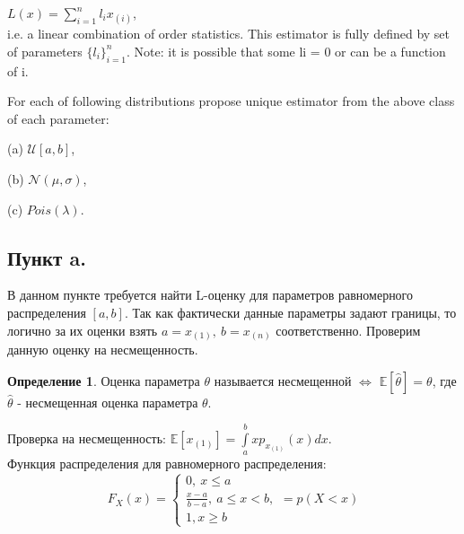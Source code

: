 \documentclass[a4paper]{article}
\theoremstyle{definition}
\newtheorem{definition}{Определение}[section]
\begin{document}
$L(x) = \sum\limits_{i=1}^{n} l_i x_{(i)}$, \\

i.e. a linear combination of order statistics. This estimator is fully defined by set of parameters $\{l_i\}_{i=1}^n$. 
Note: it is possible that some li = 0 or can be a function of i. 

For each of following distributions propose unique estimator from the above class of each parameter:

(a) $\mathcal{U}[a, b]$,

(b) $\mathcal{N}(\mu, \sigma)$,

(c) $Pois(\lambda)$.

\subsection{Пункт a.}
    В данном пункте требуется найти L-оценку для параметров равномерного распределения $[a, b]$. 
    Так как фактически данные параметры задают границы, то логично за их оценки взять $a = x_{(1)},\ b = x_{(n)}$ соответственно.
    Проверим данную оценку на несмещенность.

    \begin{definition} 
        Оценка параметра $\theta$ называется несмещенной $\Leftrightarrow$ $\mathbb{E}[\hat{\theta}] = \theta$, где $\hat{\theta}$ - несмещенная оценка параметра $\theta$.
    \end{definition}

    Проверка на несмещенность: $\mathbb{E}[x_{(1)}] = \int\limits_{a}^{b}xp_{x_{(1)}}(x)dx$. \\
    Функция распределения для равномерного распределения: \\
    \[F_{X}(x) = 
        \begin{cases}
            0, \ x \le a \\
            \frac{x-a}{b-a}, \ a \le x < b, \\
            1, x \ge b
        \end{cases} = p(X < x)
    \] \\
    
\end{document}
